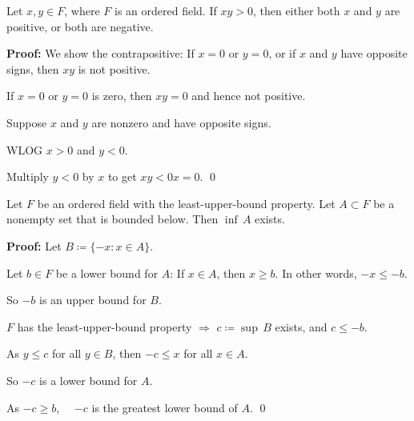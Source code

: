 \documentclass[10pt,aspectratio=149]{beamer}
\begin{document}
\begin{frame}

\begin{proposition}
Let $x,y \in F$, where $F$ is an ordered field.  If
$xy > 0$, then either both $x$ and $y$ are positive, or both are negative.
\end{proposition}

\pause
\textbf{Proof:}
We show the contrapositive: If $x=0$ or $y=0$, or
if $x$ and $y$ have opposite signs, then $xy$ is not positive.

\medskip
\pause

If $x=0$ or $y=0$ is zero, then $xy=0$ and hence not positive.

\medskip
\pause

Suppose $x$ and $y$ are nonzero and have opposite signs.

\pause

WLOG $x > 0$ and $y < 0$.

\pause

Multiply $y < 0$ by $x$ to get $xy < 0x = 0$.
\qed

\end{frame}

\begin{frame}

\begin{proposition}
Let $F$ be an ordered field with the least-upper-bound property.
Let $A \subset F$ be a nonempty set that is bounded below.
Then $\inf\, A$ exists.
\end{proposition}

\pause

\textbf{Proof:}
Let $B \coloneqq \{ -x : x \in A \}$.

\pause
Let $b \in F$ be a lower bound for $A$:
If $x \in A$, then $x \geq b$. In other words, $-x \leq -b$.

\pause
So $-b$ is an upper bound for $B$.

\pause
$F$ has the least-upper-bound property $\Rightarrow$ $c\coloneqq\sup\, B$ exists, and $c \leq -b$.

\pause
As $y \leq c$ for all $y \in B$, then $-c \leq x$ for all $x \in A$.

\pause
So $-c$ is a lower bound for $A$.

\pause
As $-c \geq b$,~~
$-c$ is the greatest lower bound of $A$.
\qed

\end{frame}
\end{document}
